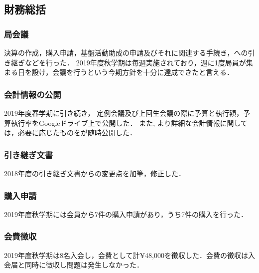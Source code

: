 \subsection*{財務総括}

\subsubsection*{局会議}
決算の作成，購入申請，基盤活動助成の申請及びそれに関連する手続き，\firstGrade{}への引き継ぎなどを行った．
2019年度秋学期は毎週実施されており，週に1度局員が集まる日を設け，会議を行うという今期方針を十分に達成できたと言える．

\subsubsection*{会計情報の公開}
2019年度春学期に引き続き， 定例会議及び上回生会議の際に予算と執行額，予算執行率をGoogleドライブ上で公開した．
また, より詳細な会計情報に関しては，必要に応じたものを\kaikeiStaff{}が随時公開した．

\subsubsection*{引き継ぎ文書}
2018年度の引き継ぎ文書からの変更点を加筆，修正した．

\subsubsection*{購入申請}
2019年度秋学期には会員から7件の購入申請があり，うち7件の購入を行った．

\subsubsection*{会費徴収}
2019年度秋学期は8名入会し，会費として計¥48,000を徴収した．会費の徴収は入会届と同時に徴収し問題は発生しなかった．

